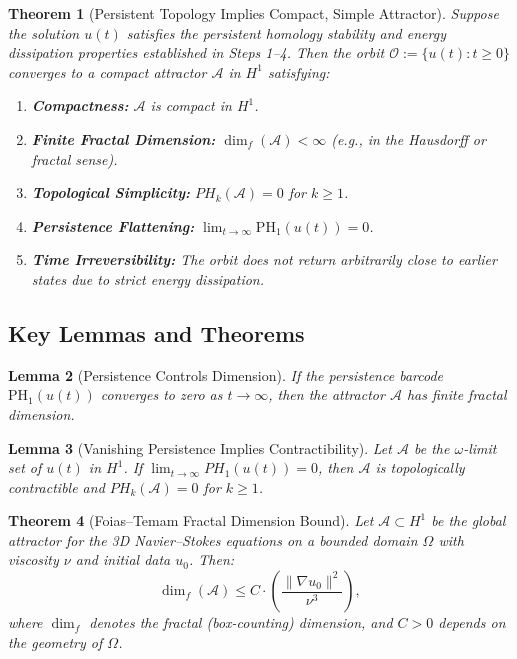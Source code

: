 \documentclass[11pt]{article}
\newtheorem{theorem}{Theorem}[section]
\newtheorem{lemma}[theorem]{Lemma}
\theoremstyle{definition}
\begin{document}
\begin{theorem}[Persistent Topology Implies Compact, Simple Attractor]
\label{thm:attractor_persistence}
Suppose the solution $u(t)$ satisfies the persistent homology stability and energy dissipation properties established in Steps 1--4. Then the orbit $\mathcal{O} := \{u(t): t \ge 0\}$ converges to a compact attractor $\mathcal{A}$ in $H^1$ satisfying:
\begin{enumerate}
  \item \textbf{Compactness:} $\mathcal{A}$ is compact in $H^1$.
  \item \textbf{Finite Fractal Dimension:} $\dim_f(\mathcal{A}) < \infty$ (e.g., in the Hausdorff or fractal sense).
  \item \textbf{Topological Simplicity:} $PH_k(\mathcal{A}) = 0$ for $k \ge 1$.
  \item \textbf{Persistence Flattening:} $\lim_{t \to \infty} \mathrm{PH}_1(u(t)) = 0$.
  \item \textbf{Time Irreversibility:} The orbit does not return arbitrarily close to earlier states due to strict energy dissipation.
\end{enumerate}
\end{theorem}

\subsection*{Key Lemmas and Theorems}

\begin{lemma}[Persistence Controls Dimension]
If the persistence barcode $\mathrm{PH}_1(u(t))$ converges to zero as $t \to \infty$, then the attractor $\mathcal{A}$ has finite fractal dimension.
\end{lemma}

\begin{lemma}[Vanishing Persistence Implies Contractibility]
Let $\mathcal{A}$ be the $\omega$-limit set of $u(t)$ in $H^1$. If $\lim_{t \to \infty} PH_1(u(t)) = 0$, then $\mathcal{A}$ is topologically contractible and $PH_k(\mathcal{A}) = 0$ for $k \ge 1$.
\end{lemma}

\begin{theorem}[Foias--Temam Fractal Dimension Bound]
Let $\mathcal{A} \subset H^1$ be the global attractor for the 3D Navier--Stokes equations on a bounded domain $\Omega$ with viscosity $\nu$ and initial data $u_0$. Then:
\[
\dim_f(\mathcal{A}) \leq C \cdot \left( \frac{\|\nabla u_0\|^2}{\nu^3} \right),
\]
where $\dim_f$ denotes the fractal (box-counting) dimension, and $C > 0$ depends on the geometry of $\Omega$.
\end{theorem}
\end{document}
